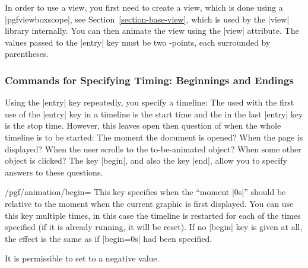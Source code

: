 In order to use a view, you first need to create a view, which is done
using a |{pgfviewboxscope}|, see Section~\ref{section-base-view},
which is used by the |view| library internally. You can then animate
the view using the |view| attribute. The values passed to the |entry|
key must be two \pgfname-points, each surrounded by parentheses.

\begin{codeexample}[width=2cm]
\end{codeexample}  


\subsubsection{Commands for Specifying Timing: Beginnings  and
  Endings}


Using the |entry| key repeatedly, you specify a timeline: The
 used with the first use of the |entry| key in a timeline
is the start time and the  in the last |entry| key is the
stop time. However, this leaves open then question of when the whole
timeline is to be started: The moment the document is opened? When the
page is displayed? When the user scrolls to the to-be-animated object?
When some other object is clicked? The key |begin|, and also the key
|end|, allow you to specify answers to these questions.

\begin{key}{/pgf/animation/begin=}
  This key specifies when the ``moment |0s|'' should be relative to
  the moment when the current graphic is first displayed. You can use
  this key multiple times, in this case the timeline is restarted for
  each of the times specified (if it is already running, it will be
  reset). If no |begin| key is given at all, the effect is the same as
  if |begin=0s| had been specified.

  It is permissible to set  to a negative value.
\end{key}

